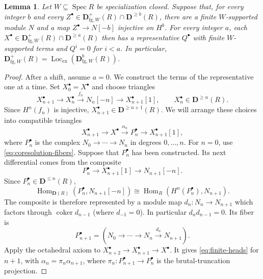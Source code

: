 \documentclass[11pt]{amsart}
\numberwithin{equation}{section}
\newtheorem{lemma}[theorem]{Lemma}
\theoremstyle{definition}
\theoremstyle{remark}
\DeclareMathOperator{\Spec}{Spec}
\DeclareMathOperator{\Loc}{Loc}
\DeclareMathOperator{\Hom}{Hom}
\DeclareMathOperator{\coker}{coker}
\newcommand{\D}{\mathbf D}
\newcommand{\fg}{\mathrm{fg}}
\newcommand{\Lex}{\Loc_{\mathrm{ex}}}
\begin{document}
\begin{lemma}\label{lem:coresolution}
Let $W\subseteq\Spec R$ be specialization closed. Suppose that, for every
integer $b$ and every
$Z^{\bullet}\in\D^+_{\fg,W}(R)\cap\D^{\geq b}(R)$, there are a finite $W$-supported module
$N$ and a map $Z^{\bullet}\to N[-b]$ injective on $H^b$.
For every integer $a$, each $X^{\bullet}\in\D^+_{\fg,W}(R)\cap\D^{\geq a}(R)$
then has a representative $Q^{\bullet}$ with
finite $W$-supported terms and $Q^i=0$ for $i<a$. In particular,
$\D^+_{\fg,W}(R)=\Lex(\D^b_{\fg,W}(R))$.
\end{lemma}
\begin{proof}
After a shift, assume $a=0$. We construct the terms of the representative
one at a time. Set $X_0^{\bullet}=X^{\bullet}$ and choose triangles
\begin{equation}\label{eq:coresolution-fibers}
 X_{n+1}^{\bullet}\longrightarrow X_n^{\bullet}\xrightarrow{f_n}N_n[-n]
 \longrightarrow X_{n+1}^{\bullet}[1],\qquad X_n^{\bullet}\in\D^{\geq n}(R).
\end{equation}
Since $H^n(f_n)$ is injective, $X_{n+1}^{\bullet}\in\D^{\geq n+1}(R)$.
We will arrange these choices into compatible triangles
\begin{equation}\label{eq:finite-heads}
 X_{n+1}^{\bullet}\longrightarrow X^{\bullet}\xrightarrow{\alpha_n}P_n^{\bullet}\longrightarrow X_{n+1}^{\bullet}[1],
\end{equation}
where $P_n^{\bullet}$ is the complex $N_0\to\cdots\to N_n$ in degrees
$0,\ldots,n$. For $n=0$, use \eqref{eq:coresolution-fibers}. Suppose that $P_n^{\bullet}$
has been constructed. Its next differential comes from the composite
\[
 P_n^{\bullet}\longrightarrow X_{n+1}^{\bullet}[1]\longrightarrow N_{n+1}[-n].
\]
Since $P_n^{\bullet}\in\D^{\leq n}(R)$,
\[
 \Hom_{\D(R)}(P_n^{\bullet},N_{n+1}[-n])
 \cong\Hom_R(H^n(P_n^{\bullet}),N_{n+1}).
\]
The composite is therefore represented by a module map
$d_n:N_n\to N_{n+1}$ which factors through $\coker d_{n-1}$
(where $d_{-1}=0$). In particular $d_nd_{n-1}=0$. Its fiber is
\[
 P_{n+1}^{\bullet}=(N_0\longrightarrow\cdots\longrightarrow N_n
 \xrightarrow{d_n}N_{n+1}).
\]
Apply the octahedral axiom to
$X_{n+2}^{\bullet}\to X_{n+1}^{\bullet}\to X^{\bullet}$.
It gives \eqref{eq:finite-heads} for $n+1$, with
$\alpha_n=\pi_n\alpha_{n+1}$, where
$\pi_n:P_{n+1}^{\bullet}\to P_n^{\bullet}$ is the brutal-truncation projection.


\end{proof}
\end{document}
